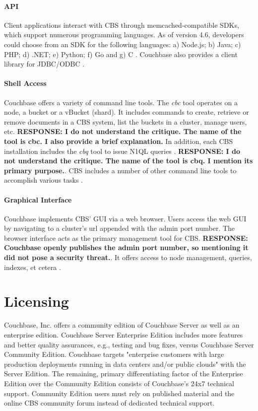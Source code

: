 \documentclass[9pt,twocolumn,twoside]{styles/osajnl}
\begin{document}
\paragraph{API}
Client applications interact with CBS through memcached-compatible SDKs, which support numerous programming languages.  As of version 4.6, developers could choose from an SDK for the following languages:  a) Node.js; b) Java; c) PHP; d) .NET; e) Python; f) Go and g) C \cite{www-sdklist-cbsinc}.  Couchbase also provides a client library for JDBC/ODBC \cite{www-downloads-cbsinc}.

\paragraph{Shell Access} Couchbase offers a variety of command line tools.  The \textit{cbc} tool operates on a node, a bucket or a vBucket (shard).  It includes commands to create, retrieve or remove documents in a CBS system, list the buckets in a cluster, manage users, etc.  \textbf{RESPONSE: I do not understand the critique.  The name of the tool is cbc.  I also provide a brief explanation.} In addition, each CBS installation includes the \textit{cbq} tool to issue N1QL queries \cite{www-cli-cbsinc}. \textbf{RESPONSE: I do not understand the critique.  The name of the tool is cbq.  I mention its primary purpose.}.  CBS includes a number of other command line tools to accomplish various tasks \cite{www-cli-intro-cbsinc}.

\paragraph{Graphical Interface} Couchbase implements CBS' GUI via a web browser.  Users access the web GUI by navigating to a cluster's url appended with the admin port number.  The browser interface acts as the primary management tool for CBS.  \textbf{RESPONSE: Couchbase openly publishes the admin port number, so mentioning it did not pose a security threat.}.  It offers access to node management, queries, indexes, et cetera \cite{www-webconsole-cbsinc}.

\section{Licensing}

Couchbase, Inc. offers a community edition of Couchbase
Server as well as an enterprise edition.  Couchbase Server Enterprise Edition includes more features and better quality assurances, e.g., testing and bug fixes, versus Couchbase Server Community Edition.  Couchbase targets "enterprise customers with large production deployments running in data centers and/or public clouds" \cite{www-downloads-cbsinc} with the Server Edition. The remaining, primary differentiating factor of the Enterprise Edition over the Community Edition consists of Couchbase's 24x7 technical support. Community Edition users must rely on published material and the online CBS community forum instead of dedicated technical support. 
\end{document}
